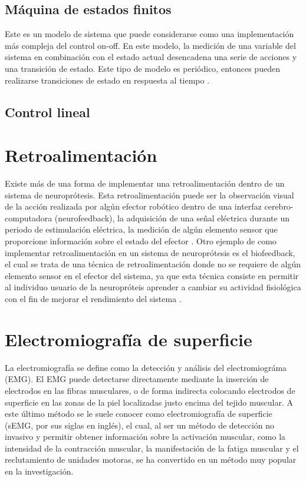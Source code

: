 \subsection{Máquina de estados finitos}
Este es un modelo de sistema que puede considerarse como una implementación más compleja del control on-off. En este modelo, la medición de una variable del sistema en combinación con el estado actual desencadena una serie de acciones y una transición de estado. Este tipo de modelo es periódico, entonces pueden realizarse transiciones de estado en respuesta al tiempo \cite{Wright2016}.

{\color{red}\subsection{Control lineal}}

\section{Retroalimentación}
Existe más de una forma de implementar una retroalimentación dentro de un sistema de neuroprótesis. Esta retroalimentación puede ser la observación visual de la acción realizada por algún efector robótico dentro de una interfaz cerebro-computadora (neurofeedback), la adquisición de una señal eléctrica durante un periodo de estimulación eléctrica, la medición de algún elemento sensor que proporcione información sobre el estado del efector \cite{Wright2016}. Otro ejemplo de como implementar retroalimentación en un sistema de neuroprótesis es el biofeedback, el cual se trata de una técnica de retroalimentación donde no se requiere de algún elemento sensor en el efector del sistema, ya que esta técnica consiste en permitir al individuo usuario de la neuropróteis aprender a cambiar su actividad fisiológica con el fin de mejorar el rendimiento del sistema \cite{Yucha2008}.

\section{Electromiografía de superficie}
La electromiografía se define como la detección y análisis del electromiográma (EMG). El EMG puede detectarse directamente mediante la inserción de electrodos en las fibras musculares, o de forma indirecta colocando electrodos de superficie en las zonas de la piel localizadas justo encima del tejido muscular. A este último método se le suele conocer como electromiografía de superficie (sEMG, por sus siglas en inglés), el cual, al ser un método de detección no invasivo y permitir obtener información sobre la activación muscular, como la intensidad de la contracción muscular, la manifestación de la fatiga muscular y el reclutamiento de unidades motoras, se ha convertido en un método muy popular en la investigación.

